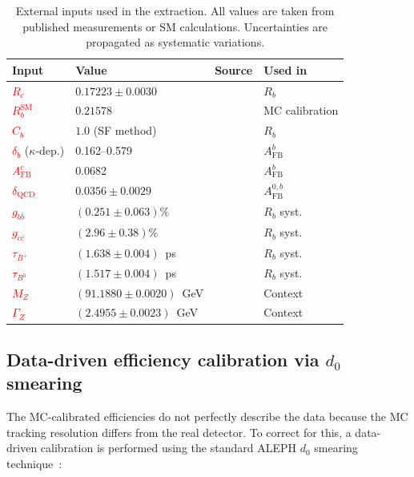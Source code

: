 \documentclass[11pt,a4paper]{article}
\newcommand{\external}[1]{\textcolor{red}{#1}}
\begin{document}
\begin{table}[htbp]
\centering
\caption{External inputs used in the extraction.
All values are taken from published measurements or SM calculations.
Uncertainties are propagated as systematic variations.}
\label{tbl:external_inputs}
\begin{tabular}{llll}
\toprule
Input & Value & Source & Used in \\
\midrule
\external{$R_c$} & $0.17223 \pm 0.0030$ & \cite{LEP:EWWG:2005} & $R_b$ \\
\external{$R_b^\text{SM}$} & $0.21578$ & \cite{LEP:EWWG:2005} & MC calibration \\
\external{$C_b$} & $1.0$ (SF method) & \cite{ALEPH:Rb:1996} & $R_b$ \\
\external{$\delta_b$} ($\kappa$-dep.) & 0.162--0.579 & \cite{LEP:EWWG:2005} & $A_\text{FB}^b$ \\
\external{$A_\text{FB}^c$} & 0.0682 & \cite{LEP:EWWG:2005} & $A_\text{FB}^b$ \\
\external{$\delta_\text{QCD}$} & $0.0356 \pm 0.0029$ & \cite{LEP:EWWG:2005} & $A_\text{FB}^{0,b}$ \\
\external{$g_{b\bar{b}}$} & $(0.251 \pm 0.063)\%$ & \cite{ALEPH:gbb} & $R_b$ syst. \\
\external{$g_{c\bar{c}}$} & $(2.96 \pm 0.38)\%$ & \cite{LEP:gcc} & $R_b$ syst. \\
\external{$\tau_{B^+}$} & $(1.638 \pm 0.004)$~ps & \cite{PDG:2024} & $R_b$ syst. \\
\external{$\tau_{B^0}$} & $(1.517 \pm 0.004)$~ps & \cite{PDG:2024} & $R_b$ syst. \\
\external{$M_Z$} & $(91.1880 \pm 0.0020)$~GeV & \cite{PDG:2024} & Context \\
\external{$\Gamma_Z$} & $(2.4955 \pm 0.0023)$~GeV & \cite{PDG:2024} & Context \\
\bottomrule
\end{tabular}
\end{table}

\subsection{Data-driven efficiency calibration via $d_0$ smearing}
\label{sec:corrections:smearing}

The MC-calibrated efficiencies do not perfectly describe the data
because the MC tracking resolution differs from the real detector.
To correct for this, a data-driven calibration is performed using
the standard ALEPH $d_0$ smearing
technique~\cite{ALEPH:Rb:precise}:
\end{document}
